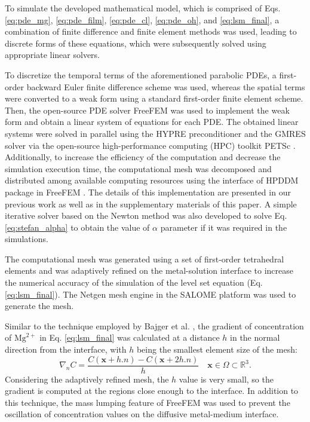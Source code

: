 To simulate the developed mathematical model, which is comprised of Eqs. \ref{eq:pde_mg}, \ref{eq:pde_film}, \ref{eq:pde_cl}, \ref{eq:pde_oh}, and \ref{eq:lsm_final}, a combination of finite difference and finite element methods was used, leading to discrete forms of these equations, which were subsequently solved using appropriate linear solvers.

To discretize the temporal terms of the aforementioned parabolic PDEs, a first-order backward Euler finite difference scheme was used, whereas the spatial terms were converted to a weak form using a standard first-order finite element scheme. Then, the open-source PDE solver FreeFEM \cite{Hecht2012} was used to implement the weak form and obtain a linear system of equations for each PDE. The obtained linear systems were solved in parallel using the HYPRE preconditioner \cite{Falgout2002} and the GMRES solver \cite{Saad1986} via the open-source high-performance computing (HPC) toolkit PETSc \cite{petsc}. Additionally, to increase the efficiency of the computation and decrease the simulation execution time, the computational mesh was decomposed and distributed among available computing resources using the interface of HPDDM package in FreeFEM \cite{Jolivet2013}. The details of this implementation are presented in our previous work \cite{Barzegari2020arXiv} as well as in the supplementary materials of this paper. A simple iterative solver based on the Newton method was also developed to solve Eq. \ref{eq:stefan_alpha} to obtain the value of $\alpha$ parameter if it was required in the simulations.

The computational mesh was generated using a set of first-order tetrahedral elements and was adaptively refined on the metal-solution interface to increase the numerical accuracy of the simulation of the level set equation (Eq. \ref{eq:lsm_final}). The Netgen mesh engine \cite{Schoeberl1997} in the SALOME platform \cite{Ribes2007} was used to generate the mesh.

Similar to the technique employed by Bajger et al. \cite{Bajger2016}, the gradient of concentration of $\mathrm{Mg}^{2+}$ in Eq. \ref{eq:lsm_final} was calculated at a distance $h$ in the normal direction from the interface, with $h$ being the smallest element size of the mesh:
\begin{equation} \label{eq:c_gradient}
\nabla_{n} C = \frac{C\left( \mathbf{x} + h.n \right) - C\left( \mathbf{x} + 2h.n \right)}{h} \quad \mathbf{x} \in \Omega \subset \mathbb{R}^{3}.
\end{equation}
Considering the adaptively refined mesh, the $h$ value is very small, so the gradient is computed at the regions close enough to the interface. In addition to this technique, the mass lumping feature of FreeFEM was used to prevent the oscillation of concentration values on the diffusive metal-medium interface.

